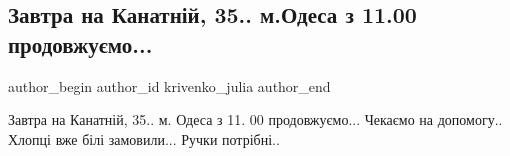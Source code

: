  
 
 
 
 
 
\subsection{Завтра на Канатній, 35.. м.Одеса з 11.00 продовжуємо...}
\label{sec:05_09_2021.fb.krivenko_julia.1.setki_front_vojna_odessa}
 
\ifcmt
 author_begin
   author_id krivenko_julia
 author_end
\fi

Завтра на Канатній, 35.. м. Одеса з 11. 00 продовжуємо... Чекаємо на допомогу..
Хлопці вже білі замовили... Ручки потрібні..

